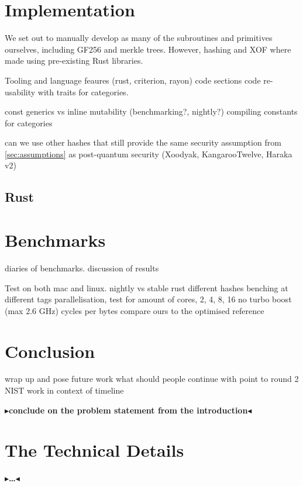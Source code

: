 \documentclass[twoside,11pt,openright]{report}
\theoremstyle{definition}
\theoremstyle{plain}
\newcommand{\todo}[1]{{\color[rgb]{.5,0,0}\textbf{$\blacktriangleright$#1$\blacktriangleleft$}}}
\begin{document}

\chapter{Implementation}
\label{ch:impl}

We set out to manually develop as many of the subroutines and primitives ourselves, including GF256 and merkle trees. However, hashing and XOF where made using pre-existing Rust libraries.

Tooling and language feaures (rust, criterion, rayon)
code sections
code re-usability with traits for categories.

const generics vs inline mutability (benchmarking?, nightly?)
compiling constants for categories

can we use other hashes that still provide the same security assumption from \autoref{sec:assumptions} as post-quantum security (Xoodyak, KangarooTwelve, Haraka v2)

\section{Rust}
\cite{nistsaferlanguages}


\chapter{Benchmarks}
\label{ch:bench}
diaries of benchmarks.
discussion of results

Test on both mac and linux.
nightly vs stable rust
different hashes
benching at different tags
parallelisation, test for amount of cores, 2, 4, 8, 16
no turbo boost (max 2.6 GHz)
cycles per bytes
compare ours to the optimised reference


\chapter{Conclusion}
\label{ch:conclusion}

wrap up and pose future work
what should people continue with
point to round 2 NIST
work in context of timeline

\todo{conclude on the problem statement from the introduction}


\cleardoublepage
{}




\cleardoublepage
\appendix
\chapter{The Technical Details}

\todo{\dots}
\end{document}
